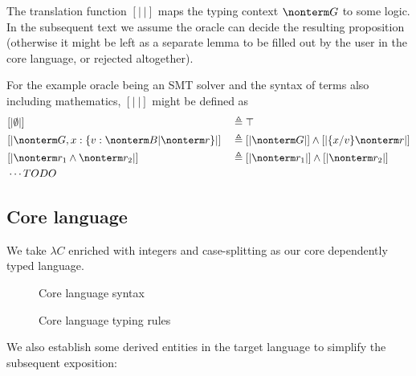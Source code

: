 \documentclass[a4paper]{article}
\begin{document}
The translation function $[|\ |]$ maps the typing context $\nonterm G$ to some logic.
In the subsequent text we assume the oracle can decide the resulting proposition
(otherwise it might be left as a separate lemma to be filled out by the user in the core language, or rejected altogether).

For the example oracle being an SMT solver and the syntax of terms also including mathematics, $[|\ |]$ might be defined as
\begin{equation}
\begin{aligned}
  & [| \emptyset |]                                         && \triangleq \top																						 \\
  & [| \nonterm G, x : \{ v : \nonterm B | \nonterm r \} |] && \triangleq [| \nonterm G |] \land [| \{x/v\} \nonterm r |] \\
  & [| \nonterm r_1 \land \nonterm r_2 |]                   && \triangleq [| \nonterm r_1 |] \land [| \nonterm r_2 |]		 \\
  & \cdots TODO
\end{aligned}
\end{equation}


\subsection{Core language}

We take $\lambda C$ \cite{Nederpelt14} enriched with integers and case-splitting as our core dependently typed language.

\begin{figure}[ht]
  \footnotesize
  \caption{Core language syntax}
  \label{fig:core_syntax}
\end{figure}

\begin{figure}[ht]
  \footnotesize
  \caption{Core language typing rules}
  \label{fig:core_typing}
\end{figure}

We also establish some derived entities in the target language to simplify the subsequent exposition:
\end{document}
